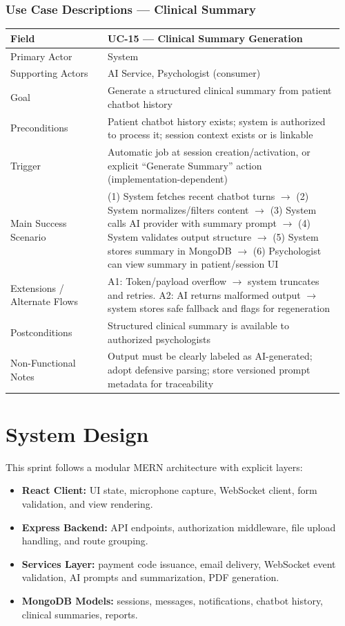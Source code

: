 \documentclass[12pt]{article}
\begin{document}
\subsubsection*{Use Case Descriptions --- Clinical Summary}
\begin{longtable}{L{0.28\linewidth} L{0.68\linewidth}}
\toprule
\textbf{Field} & \textbf{UC-15 --- Clinical Summary Generation} \\
\midrule
\endhead
Primary Actor & System \\
Supporting Actors & AI Service, Psychologist (consumer) \\
Goal & Generate a structured clinical summary from patient chatbot history \\
Preconditions & Patient chatbot history exists; system is authorized to process it; session context exists or is linkable \\
Trigger & Automatic job at session creation/activation, or explicit ``Generate Summary'' action (implementation-dependent) \\
Main Success Scenario & (1) System fetches recent chatbot turns $\rightarrow$ (2) System normalizes/filters content $\rightarrow$ (3) System calls AI provider with summary prompt $\rightarrow$ (4) System validates output structure $\rightarrow$ (5) System stores summary in MongoDB $\rightarrow$ (6) Psychologist can view summary in patient/session UI \\
Extensions / Alternate Flows & A1: Token/payload overflow $\rightarrow$ system truncates and retries. A2: AI returns malformed output $\rightarrow$ system stores safe fallback and flags for regeneration \\
Postconditions & Structured clinical summary is available to authorized psychologists \\
Non-Functional Notes & Output must be clearly labeled as AI-generated; adopt defensive parsing; store versioned prompt metadata for traceability \\
\bottomrule
\end{longtable}

\section{System Design}
This sprint follows a modular MERN architecture with explicit layers:
\begin{itemize}[leftmargin=*]
  \item \textbf{React Client:} UI state, microphone capture, WebSocket client, form validation, and view rendering.
  \item \textbf{Express Backend:} API endpoints, authorization middleware, file upload handling, and route grouping.
  \item \textbf{Services Layer:} payment code issuance, email delivery, WebSocket event validation, AI prompts and summarization, PDF generation.
  \item \textbf{MongoDB Models:} sessions, messages, notifications, chatbot history, clinical summaries, reports.
\end{itemize}
\end{document}
